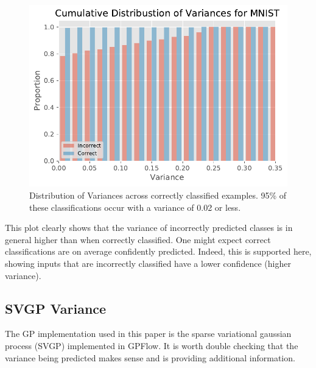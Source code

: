 \documentclass{article}
\begin{document}
\begin{figure}[hbt]
\centering
\includegraphics[width=\hsize]{figures/mnist/variances_combined.pdf}
\caption{Distribution of Variances across correctly classified examples. 95\% of these classifications occur with a variance of 0.02 or less.}
\label{fig:mnist-variances}
\end{figure}


This plot clearly shows that the variance of incorrectly predicted classes is in general higher than when correctly classified. One might expect correct classifications are on average confidently predicted. Indeed, this is supported here, showing inputs that are incorrectly classified have a lower confidence (higher variance). 



\subsection{SVGP Variance}
\label{sec:svgp-variance}
The GP implementation used in this paper is the sparse variational gaussian process (SVGP) implemented in GPFlow. It is worth double checking that the variance being predicted makes sense and is providing additional information.
\end{document}

